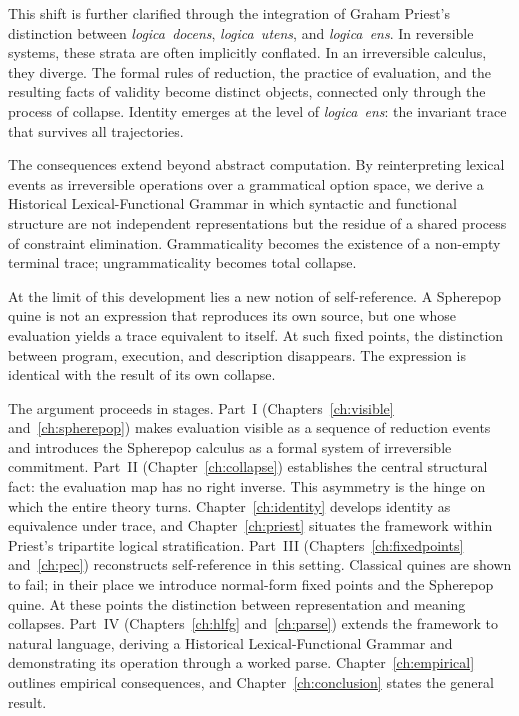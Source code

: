 \documentclass[12pt, oneside]{amsbook}
\theoremstyle{plain}
\theoremstyle{definition}
\theoremstyle{remark}
\newcommand{\docens}{\textit{logica~docens}}
\newcommand{\utens}{\textit{logica~utens}}
\newcommand{\ens}{\textit{logica~ens}}
\begin{document}
This shift is further clarified through the integration of Graham Priest's
distinction between \docens{}, \utens{}, and \ens{}. In reversible systems,
these strata are often implicitly conflated. In an irreversible calculus, they
diverge. The formal rules of reduction, the practice of evaluation, and the
resulting facts of validity become distinct objects, connected only through the
process of collapse. Identity emerges at the level of \ens{}: the invariant
trace that survives all trajectories.

The consequences extend beyond abstract computation. By reinterpreting lexical
events as irreversible operations over a grammatical option space, we derive
a Historical Lexical-Functional Grammar in which syntactic and functional
structure are not independent representations but the residue of a shared
process of constraint elimination. Grammaticality becomes the existence of a
non-empty terminal trace; ungrammaticality becomes total collapse.

At the limit of this development lies a new notion of self-reference. A
Spherepop quine is not an expression that reproduces its own source, but one
whose evaluation yields a trace equivalent to itself. At such fixed points,
the distinction between program, execution, and description disappears. The
expression is identical with the result of its own collapse.

The argument proceeds in stages. Part~I (Chapters~\ref{ch:visible}
and~\ref{ch:spherepop}) makes evaluation visible as a sequence of reduction
events and introduces the Spherepop calculus as a formal system of irreversible
commitment. Part~II (Chapter~\ref{ch:collapse}) establishes the central
structural fact: the evaluation map has no right inverse. This asymmetry is the
hinge on which the entire theory turns. Chapter~\ref{ch:identity} develops
identity as equivalence under trace, and Chapter~\ref{ch:priest} situates the
framework within Priest's tripartite logical stratification. Part~III
(Chapters~\ref{ch:fixedpoints} and~\ref{ch:pec}) reconstructs self-reference
in this setting. Classical quines are shown to fail; in their place we introduce
normal-form fixed points and the Spherepop quine. At these points the distinction
between representation and meaning collapses. Part~IV
(Chapters~\ref{ch:hlfg} and~\ref{ch:parse}) extends the framework to natural
language, deriving a Historical Lexical-Functional Grammar and demonstrating its
operation through a worked parse. Chapter~\ref{ch:empirical} outlines empirical
consequences, and Chapter~\ref{ch:conclusion} states the general result.
\end{document}
